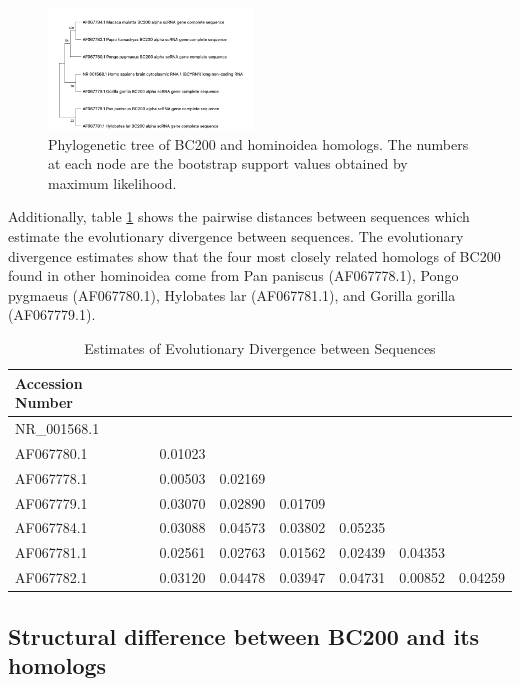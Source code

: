 \documentclass[conference]{IEEEtran}
\begin{document}
\begin{figure}[h]
  \centering
  \includegraphics[width=0.485\textwidth]{figs/phylogenetic-tree.jpg}
  \caption{Phylogenetic tree of BC200 and hominoidea homologs. The numbers at each node are the bootstrap support values obtained by maximum likelihood.}
  \label{fig:phylo-tree}
\end{figure}

Additionally, table \ref{tbl:distances} shows the pairwise distances between sequences which estimate the evolutionary divergence between sequences. 
The evolutionary divergence estimates show that the four most closely related homologs of BC200 found in other hominoidea come from Pan paniscus (AF067778.1), Pongo pygmaeus (AF067780.1), Hylobates lar (AF067781.1), and Gorilla gorilla (AF067779.1). 

\begin{table}[h]
  \centering
  \caption{Estimates of Evolutionary Divergence between Sequences}
  \label{tbl:distances}
  \begin{tabular}{lcccccc}
    \toprule
    Accession Number \\
    \midrule
    NR\_001568.1 \\
    AF067780.1   & 0.01023 \\
    AF067778.1   & 0.00503 & 0.02169 \\
    AF067779.1   & 0.03070 & 0.02890 & 0.01709 \\ 
    AF067784.1   & 0.03088 & 0.04573 & 0.03802 & 0.05235 \\
    AF067781.1   & 0.02561 & 0.02763 & 0.01562 & 0.02439 & 0.04353 \\ 
    AF067782.1   & 0.03120 & 0.04478 & 0.03947 & 0.04731 & 0.00852 & 0.04259 \\
    \bottomrule
  \end{tabular}
\end{table}

\subsection{Structural difference between BC200 and its homologs}
\end{document}
